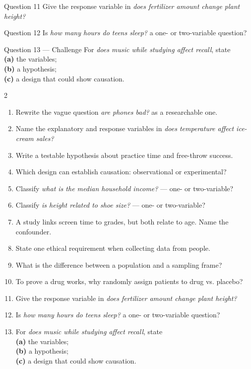\documentclass[11pt]{article}
\begin{document}
\begin{qbox}{Question 11}
Give the response variable in \emph{does fertilizer amount change plant height?}\workspace{2.4cm}
\end{qbox}

\begin{qbox}{Question 12}
Is \emph{how many hours do teens sleep?} a one- or two-variable question?\workspace{2.4cm}
\end{qbox}

\begin{qbox}{Question 13 --- Challenge}
For \emph{does music while studying affect recall}, state \\ \textbf{(a)} the variables; \\ \textbf{(b)} a hypothesis; \\ \textbf{(c)} a design that could show causation.\workspace{3cm}
\end{qbox}

\clearpage
{}

\begin{recapbox}
\begin{multicols}{2}
\small
\begin{enumerate}[leftmargin=*,itemsep=3pt]
  \item Rewrite the vague question \emph{are phones bad?} as a researchable one.
  \item Name the explanatory and response variables in \emph{does temperature affect ice-cream sales?}
  \item Write a testable hypothesis about practice time and free-throw success.
  \item Which design can establish causation: observational or experimental?
  \item Classify \emph{what is the median household income?} --- one- or two-variable?
  \item Classify \emph{is height related to shoe size?} --- one- or two-variable?
  \item A study links screen time to grades, but both relate to age. Name the confounder.
  \item State one ethical requirement when collecting data from people.
  \item What is the difference between a population and a sampling frame?
  \item To prove a drug works, why randomly assign patients to drug vs. placebo?
  \item Give the response variable in \emph{does fertilizer amount change plant height?}
  \item Is \emph{how many hours do teens sleep?} a one- or two-variable question?
  \item For \emph{does music while studying affect recall}, state \\ \textbf{(a)} the variables; \\ \textbf{(b)} a hypothesis; \\ \textbf{(c)} a design that could show causation.
\end{enumerate}
\end{multicols}
\end{recapbox}
\end{document}
